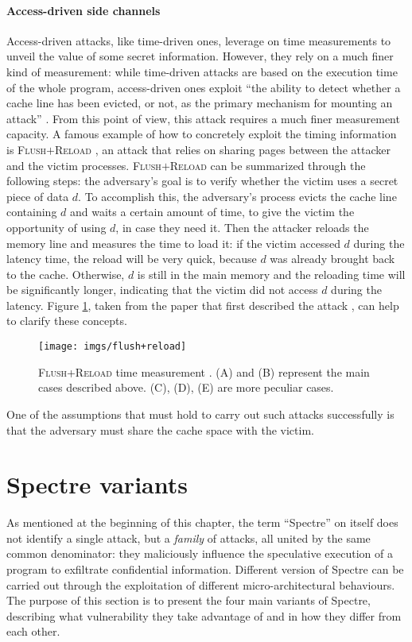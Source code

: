 \documentclass[target=mst,aauheader=aics]{thud}
\theoremstyle{definition}
\begin{document}
	\paragraph{Access-driven side channels} 
	Access-driven attacks, like time-driven ones, leverage on time measurements to unveil the value of some secret information. However, they rely on a much finer kind of measurement: while time-driven attacks are based on the execution time of the whole program, access-driven ones exploit ``the ability to
	detect whether a cache line has been evicted, or not, as the primary	mechanism for mounting an attack'' \cite{Neve2007}. From this point of view, this attack requires a much finer measurement capacity. A famous example of how to concretely exploit the timing information is \textsc{Flush$+$Reload} \cite{Yarom2014}, an attack that relies on sharing pages between the attacker and the victim processes. \textsc{Flush$+$Reload} can be summarized through the following steps: the adversary's goal is to verify whether the victim uses a secret piece of data $d$. To accomplish this, the adversary's process evicts the cache line containing $d$ and waits a certain amount of time, to give the victim the opportunity of using $d$, in case they need it. Then the attacker reloads the memory line and measures the time to load it: if the victim accessed $d$ during the latency time, the reload will be very quick, because $d$ was already brought back to the cache. Otherwise, $d$ is still in the main memory and the reloading time will be significantly longer, indicating that the victim did not access $d$ during the latency. Figure \ref{fig:flush-reload}, taken from the paper that first described the attack \cite{Yarom2014}, can help to clarify these concepts.  
	\begin{figure}
		\centering
		\texttt{[image: imgs/flush+reload]}
		\captionsetup{width=.7\linewidth}
		\caption{\textsc{Flush+Reload} time measurement \cite{Yarom2014}. (A) and (B) represent the main cases described above. (C), (D), (E) are more peculiar cases.}
		\label{fig:flush-reload}
	\end{figure}
	One of the assumptions that must hold to carry out such attacks successfully is that the adversary must share the cache space with the victim.
	
	\section{Spectre variants}\label{sec:spectre-var}
	As mentioned at the beginning of this chapter, the term ``Spectre'' on itself does not identify a single attack, but a \textit{family} of attacks, all united by the same common denominator: they maliciously influence the speculative execution of a program to exfiltrate confidential information. Different version of Spectre can be carried out through the exploitation of different micro-architectural behaviours. The purpose of this section is to present the four main variants of Spectre, describing what vulnerability they take advantage of and in how they differ from each other.
\end{document}
